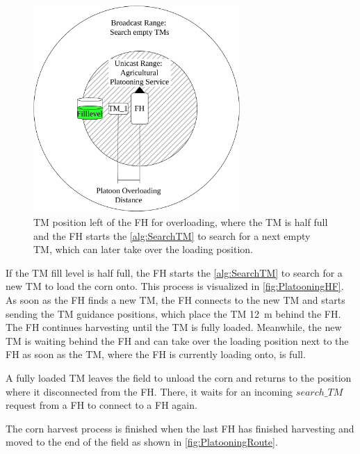 \begin{figure}[]%
	\centering
	\includegraphics[width=0.7\textwidth]{figures/platoonHALF}
	\caption{\acf{TM} position left of the \acf{FH} for overloading, where the \ac{TM} is half full and the
		\ac{FH} starts the \autoref{alg:SearchTM} to search for a next empty \ac{TM},
		which can later take over the loading position.}
	\label{fig:PlatooningHF}%
\end{figure}
If the \ac{TM} fill level is half full, the \ac{FH} starts the \autoref{alg:SearchTM}
to search for a new \ac{TM} to load the corn onto.
This process is visualized in \autoref{fig:PlatooningHF}.
As soon as the \ac{FH} finds a new \ac{TM}, the \ac{FH} connects to the new \ac{TM} and starts sending
the \ac{TM} guidance positions, which place the \ac{TM} \SI{12}{\metre} behind the \ac{FH}.
The \ac{FH} continues harvesting until the \ac{TM} is fully loaded.
Meanwhile, the new \ac{TM} is waiting behind the \ac{FH} and can take over the loading position next to the \ac{FH} as
soon as the \ac{TM}, where the \ac{FH} is currently loading onto, is full.

A fully loaded \ac{TM} leaves the field to unload the corn and returns to the position where it disconnected from the \ac{FH}.
There, it waits for an incoming $search\_TM$ request from a \ac{FH} to connect to a \ac{FH} again.

The corn harvest process is finished when the last \ac{FH} has finished harvesting and moved to the end of the field as
shown in \autoref{fig:PlatooningRoute}.


